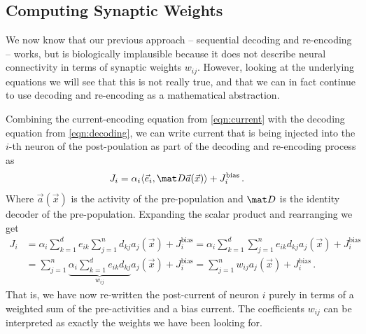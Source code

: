 \documentclass[10pt,letterpaper,oneside]{article}
\begin{document}

	\subsection{Computing Synaptic Weights}

	We now know that our previous approach -- sequential decoding and re-encoding -- works, but is biologically implausible because it does not describe neural connectivity in terms of synaptic weights $w_{ij}$. However, looking at the underlying equations we will see that this is not really true, and that we can in fact continue to use decoding and re-encoding as a mathematical abstraction.

	Combining the current-encoding equation from \cref{eqn:current} with the decoding equation from \cref{eqn:decoding}, we can write current that is being injected into the $i$-th neuron of the post-poulation as part of the decoding and re-encoding process as
	\begin{align*}
		J_i &= \alpha_i \langle \vec e_i, \mat D \vec a(\vec x) \rangle + J^\mathrm{bias}_i \,.
	\end{align*}
	Where $\vec a(\vec x)$ is the activity of the pre-population and $\mat D$ is the identity decoder of the pre-population. Expanding the scalar product and rearranging we get
	\begin{align*}
		J_i &= \alpha_i \sum_{k=1}^d e_{ik} \sum_{j=1}^n d_{kj} a_j(\vec x) + J^\mathrm{bias}_i
		     = \alpha_i \sum_{k=1}^d \sum_{j=1}^n e_{ik} d_{kj} a_j(\vec x) + J^\mathrm{bias}_i \\
		    &= \sum_{j=1}^n \underbrace{\alpha_i  \sum_{k=1}^d e_{ik} d_{kj}}_{w_{ij}} a_j(\vec x) + J^\mathrm{bias}_i
		     = \sum_{j=1}^n w_{ij} a_j(\vec x) + J^\mathrm{bias}_i \,.
	\end{align*}
	That is, we have now re-written the post-current of neuron $i$ purely in terms of a weighted sum of the pre-activities and a bias current. The coefficients $w_{ij}$ can be interpreted as exactly the weights we have been looking for.
\end{document}
